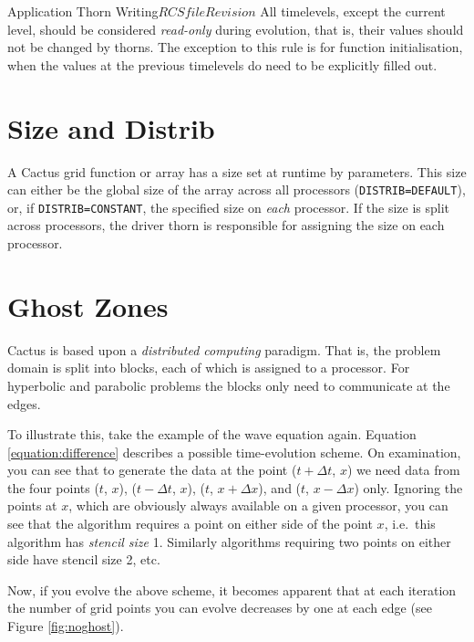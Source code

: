 \begin{cactuspart}{Application Thorn Writing}{$RCSfile$}{$Revision$}
All timelevels, except the current level, should be considered \emph{read-only} during evolution, that is, their values should not be changed by thorns.
The exception to this rule is for function initialisation, when the
values at the previous timelevels do need to be explicitly filled out.


\section{Size and Distrib}

A Cactus grid function or array has a size set at runtime by parameters.
This size can either be the global size of the array across all processors
(\texttt{DISTRIB=DEFAULT}),
or, if \texttt{DISTRIB=CONSTANT}, the specified
size on \emph{each} processor.
If the size is split across processors, the driver thorn is
responsible for assigning the size on each processor.


\section{Ghost Zones}
\label{sec:ghost_size}

Cactus is based upon a \textit{distributed computing} paradigm.  That is,
the problem domain is split into blocks, each of which is assigned to
a processor.  For hyperbolic and parabolic problems the blocks only
need to communicate at the edges.

To illustrate this, take the example of the wave equation again.
Equation \ref{equation:difference} describes a possible time-evolution
scheme.  On examination, you can see that to generate the data at the
point ($t+\Delta t$, $x$) we need data from the four points ($t$,
$x$), ($t-\Delta t$, $x$), ($t$, $x+\Delta x$), and ($t$, $x-\Delta x$)
only.  Ignoring the points at $x$, which are obviously always
available on a given processor, you can see that the algorithm
requires a point on either side of the point $x$, i.e.\ this algorithm
has \textit{stencil size} 1.  Similarly algorithms requiring two points
on either side have stencil size 2, etc.

Now, if you evolve the above scheme, it becomes apparent that at each
iteration the number of grid points you can evolve decreases by one at
each edge (see Figure \ref{fig:noghost}).


\end{cactuspart}
